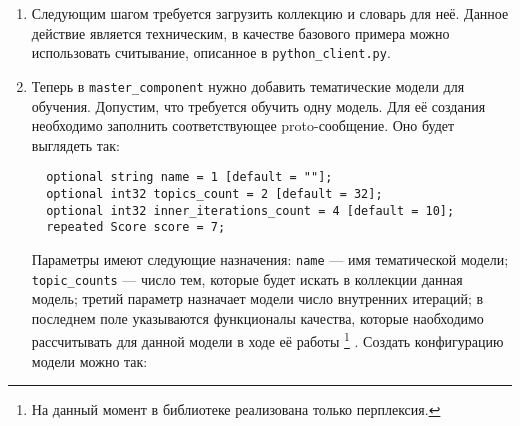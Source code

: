 \begin{enumerate}
	Первое поле представляет собой число процессоров, в рамках которых будет производится распараллеливание алгоритма. Второе поле описывает путь к папке, в которую будут сохранятся данные, преобразованные в \verb|Batches| (кроме того, именно в этой папке библиотека будет искать пакеты для своей работы). Создание и описание этого сообщения может иметь следующий вид:
	
	\vspace{5pt}
	
	\verb|  master_config = messages_pb2.MasterComponentConfig()| \\
	\verb|  master_config.processors_count = 1| \\
	\verb|  master_config.disk_path = 'disk_path'|	
	
	\vspace{5pt}
	
	После того, как конфигурационное сообщение сформировано, можно создать сам объект \verb|MasterComponent|:
	
	\vspace{5pt}
	
	\verb|  master_component = library.CreateMasterComponent(master_config)|
	
	\vspace{5pt}
	
	\item Следующим шагом требуется загрузить коллекцию и словарь для неё. Данное действие является техническим, в качестве базового примера можно использовать считывание, описанное в \verb|python_client.py|. 
	
	\item
	\label{step_1}
	 Теперь в \verb|master_component| нужно добавить тематические модели для обучения. Допустим, что требуется обучить одну модель. Для её создания необходимо заполнить соответствующее proto-сообщение. Оно будет выглядеть так:

	\vspace{5pt}

	\verb|  optional string name = 1 [default = ""];| \\
	\verb|  optional int32 topics_count = 2 [default = 32];| \\	
	\verb|  optional int32 inner_iterations_count = 4 [default = 10];| \\
	\verb|  repeated Score score = 7;|
	
	\vspace{5pt}
	
	Параметры имеют следующие назначения: 	\verb|name| --- имя тематической модели; \verb|topic_counts| --- число тем, которые будет искать в коллекции данная модель; третий  параметр назначает модели число внутренних итераций; в последнем поле указываются функционалы качества, которые наобходимо рассчитывать для данной модели в ходе её работы
	\footnote{На данный момент в библиотеке реализована только перплексия.}
	. Создать конфигурацию модели можно так:
	

\end{enumerate}
